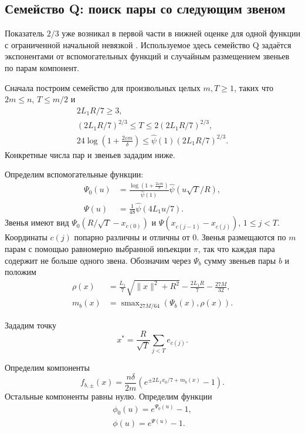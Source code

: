 \subsection{Семейство Q: поиск пары со следующим звеном}

Показатель $2/3$ уже возникал в первой части в нижней оценке для одной
функции с ограниченной начальной невязкой
\citep[теорема~B.3]{rudomanov2026everest}.
Используемое здесь семейство Q задаётся экспонентами от вспомогательных функций
и случайным размещением звеньев по парам компонент.

Сначала построим семейство для произвольных целых $m,T\ge1$,
таких что $2m\le n$, $T\le m/2$ и
\[
 \begin{gathered}
 2L_1R/7\ge3,\\
 (2L_1R/7)^{2/3}\le T\le2(2L_1R/7)^{2/3},\\
 24\log\!\left(1+\frac{2\varepsilon m}{\delta}\right)\le\widehat\psi(1)(2L_1R/7)^{2/3}.
 \end{gathered}
\]
Конкретные числа пар и звеньев зададим ниже.

Определим вспомогательные функции:
\[
 \begin{aligned}
 \Psi_0(u)&=\frac{\log\!\left(1+\frac{2\varepsilon m}{\delta}\right)}{\widehat\psi(1)}
             \widehat\psi(u\sqrt T/R),\\
 \Psi(u)&=\frac1{48}\widehat\psi(4L_1u/7).
 \end{aligned}
\]
Звенья имеют вид $\Psi_0(R/\sqrt T-x_{c(0)})$ и
$\Psi(x_{c(j-1)}-x_{c(j)})$, $1\le j<T$. Координаты $c(j)$ попарно различны и отличны от $0$.
Звенья размещаются по $m$ парам с помощью равномерно выбранной инъекции $\pi$, так что каждая пара содержит
не больше одного звена. Обозначим через $\Psi_b$ сумму звеньев пары $b$ и положим
\[
 \begin{aligned}
 \rho(x)&=\frac{L_1}7\sqrt{\|x\|^2+R^2}-\frac{2L_1R}7-\frac{27M}{32},\\
 m_b(x)&=\operatorname{smax}_{27M/64}(\Psi_b(x),\rho(x)).
 \end{aligned}
\]

Зададим точку
\[
 x^\ast=\frac R{\sqrt T}\sum_{j<T}e_{c(j)}.
\]

Определим компоненты
\[
 f_{b,\pm}(x)=\frac{n\delta}{2m}
 \left(e^{\pm2L_1x_0/7+m_b(x)}-1\right).
\]
Остальные компоненты равны нулю. 
Определим функции
\[
 \begin{gathered}
 \phi_0(u)=e^{\Psi_0(u)}-1,\\
 \phi(u)=e^{\Psi(u)}-1.
 \end{gathered}
\]

